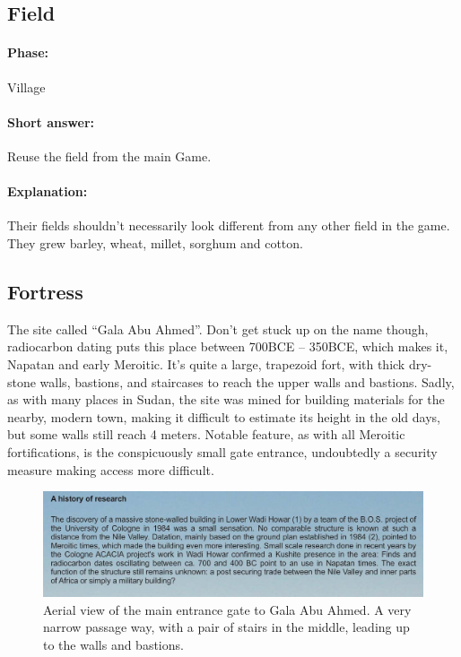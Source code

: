 \documentclass[a4paper,12pt]{scrreprt}
\begin{document}
\subsection{Field}

\paragraph{Phase:} Village\\

\paragraph{Short answer:} Reuse the field from the main Game.

\paragraph{Explanation:}

Their fields shouldn’t necessarily look different from any other field in the game. They grew barley, wheat, millet, sorghum and cotton.

\subsection{Fortress}

The site called “Gala Abu Ahmed”. Don’t get stuck up on the name though, radiocarbon dating puts this place between 700BCE – 350BCE, which makes it, Napatan and early Meroitic. It’s quite a large, trapezoid fort, with thick dry-stone walls, bastions, and staircases to reach the upper walls and bastions. Sadly, as with many places in Sudan, the site was mined for building materials for the nearby, modern town, making it difficult to estimate its height in the old days, but some walls still reach 4 meters. Notable feature, as with all Meroitic fortifications, is the conspicuously small gate entrance, undoubtedly a security measure making access more difficult. 


\begin{figure}[H]
	\centering
	\includegraphics[width=\textwidth]{img/fortress/history_of_research}
	\caption{Aerial view of the main entrance gate to Gala Abu Ahmed. A very narrow passage way, with a pair of stairs in the middle, leading up to the walls and bastions.}
\end{figure}
\end{document}
